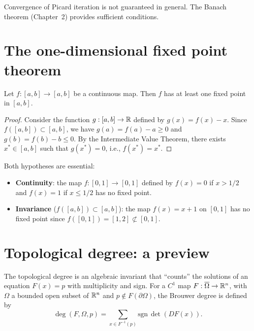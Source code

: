 \begin{remark}
Convergence of Picard iteration is not guaranteed in general. The Banach theorem
(Chapter~2) provides sufficient conditions.
\end{remark}

\section{The one-dimensional fixed point theorem}

\begin{theorem}
Let $f : [a,b] \to [a,b]$ be a continuous map. Then $f$ has at least one fixed
point in $[a,b]$.
\end{theorem}

\begin{proof}
Consider the function $g : [a,b] \to \mathbb{R}$ defined by $g(x) = f(x) - x$. Since
$f([a,b]) \subset [a,b]$, we have $g(a) = f(a) - a \geq 0$ and
$g(b) = f(b) - b \leq 0$. By the Intermediate Value Theorem, there exists
$x^* \in [a,b]$ such that $g(x^*) = 0$, i.e., $f(x^*) = x^*$.
\end{proof}

\begin{warning}[title=\textbf{Necessary hypotheses}]
Both hypotheses are essential:
\begin{itemize}
    \item \textbf{Continuity}: the map $f : [0,1] \to [0,1]$ defined by
          $f(x) = 0$ if $x > 1/2$ and $f(x) = 1$ if $x \leq 1/2$ has no fixed point.
    \item \textbf{Invariance} ($f([a,b]) \subset [a,b]$): the map $f(x) = x + 1$
          on $[0,1]$ has no fixed point since $f([0,1]) = [1,2] \not\subset [0,1]$.
\end{itemize}
\end{warning}

\section{Topological degree: a preview}

The topological degree is an algebraic invariant that ``counts'' the solutions
of an equation $F(x) = p$ with multiplicity and sign. For a $C^1$ map
$F : \overline{\Omega} \to \mathbb{R}^n$, with $\Omega$ a bounded open subset of $\mathbb{R}^n$
and $p \notin F(\partial\Omega)$, the Brouwer degree is defined by
\[
    \deg(F, \Omega, p) = \sum_{x \in F^{-1}(p)} \mathrm{sgn}\,\det(DF(x)).
\]


